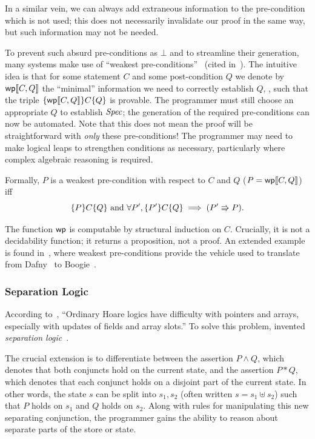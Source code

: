 In a similar vein, we can always add extraneous information to the pre-condition
which is not used; this does not necessarily invalidate our proof in the same
way, but such information may not be needed.

To prevent such absurd pre-conditions as \(\bot\) and to streamline their
generation, many systems make use of ``weakest
pre-conditions''~\cite{dijkstra1976discipline,Nelson_1989} (cited
in~\cite{leino2008specification}). The intuitive idea is that for some statement
\(C\) and some post-condition \(Q\) we denote by \(\mathsf{wp}\llbracket C, Q\rrbracket\) the ``minimal''
information we need to correctly establish \(Q\), \ie, such that the triple
\(\{\mathsf{wp}\llbracket C,Q\rrbracket\} C \{Q\}\) is provable. The programmer must still choose an
appropriate \(Q\) to establish \(\mathit{Spec}\); the generation of the required
pre-conditions can now be automated. Note that this does not mean the proof will
be straightforward with \emph{only} these pre-conditions! The programmer may
need to make logical leaps to strengthen conditions as necessary, particularly
where complex algebraic reasoning is required.

Formally, \(P\) is a weakest pre-condition with respect to \(C\) and \(Q\) (\(P
= \mathsf{wp}\llbracket C,Q\rrbracket\)) iff
\begin{equation*}
    \{P\} C \{Q\} \text{ and } \forall P', \{P'\} C \{Q\} \implies (P' \mathrel{\Rrightarrow} P).
\end{equation*}

The function \(\mathsf{wp}\) is computable by structural induction on
\(C\). Crucially, it is not a decidability function; it returns a proposition,
not a proof. An extended example is found in~\cite[\S 3]{leino2008specification},
where weakest pre-conditions provide the vehicle used to translate from
Dafny~\cite{leino2010dafny} to Boogie~\cite{Barnett_2006,leino2008this}.

\subsubsection{Separation Logic}

According to~\cite[\S 5]{Appel_2011}, ``Ordinary Hoare logics have difficulty
with pointers and arrays, especially with updates of fields and array slots.''
To solve this problem, \citeauthor{Reynolds} invented \emph{separation
logic}~\cite{Reynolds}.

The crucial extension is to differentiate between the assertion \(P \land Q\),
which denotes that both conjuncts hold on the current state, and the assertion
\(P * Q\), which denotes that each conjunct holds on a disjoint part of the
current state. In other words, the state \(s\) can be split into \(s_1, s_2\)
(often written \(s = s_1 \uplus s_2\)) such that \(P\) holds on \(s_1\) and
\(Q\) holds on \(s_2\). Along with rules for manipulating this new separating
conjunction, the programmer gains the ability to reason about separate parts of
the store or state.

